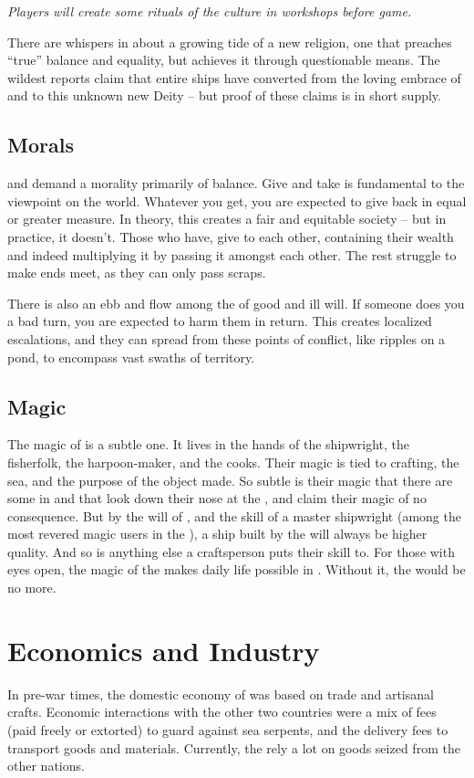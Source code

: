 \documentclass[blue]{GL2020}
\begin{document}
\emph{Players will create some rituals of the culture in workshops before game.}

There are whispers in \pShip{} about a growing tide of a new religion, one that preaches ``true'' balance and equality, but achieves it through questionable means. The wildest reports claim that entire ships have converted from the loving embrace of \cEbb{} and \cFlow{} to this unknown new Deity -- but proof of these claims is in short supply.

\subsection*{Morals}
\cEbb{} and \cFlow{} demand a morality primarily of balance. Give and take is fundamental to the \pShip{} viewpoint on the world. Whatever you get, you are expected to give back in equal or greater measure. In theory, this creates a fair and equitable society -- but in practice, it doesn't. Those who have, give to each other, containing their wealth and indeed multiplying it by passing it amongst each other. The rest struggle to make ends meet, as they can only pass scraps. 

There is also an ebb and flow among the \pShippies{} of good and ill will. If someone does you a bad turn, you are expected to harm them in return. This creates localized escalations, and they can spread from these points of conflict, like ripples on a pond, to encompass vast swaths of \pShip{} territory.

\subsection*{Magic}
The magic of \pShip{} is a subtle one. It lives in the hands of the shipwright, the fisherfolk, the harpoon-maker, and the cooks. Their magic is tied to crafting, the sea, and the purpose of the object made. So subtle is their magic that there are some in \pFarm{} and \pTech{} that look down their nose at the \pShippies{}, and claim their magic of no consequence. But by the will of \cEbb{\full}, and the skill of a master shipwright (among the most revered magic users in the \pShip{}), a ship built by the \pShippies{} will always be higher quality. And so is anything else a \pShippie{} craftsperson puts their skill to. For those with eyes open, the magic of the \pShippies{} makes daily life possible in \pEarth{}. Without it, the \pShippies{} would be no more.

\section*{Economics and Industry}
In pre-war times, the domestic economy of \pShip{} was based on trade and artisanal crafts. Economic interactions with the other two countries were a mix of fees (paid freely or extorted) to guard against sea serpents, and the delivery fees to transport goods and materials. Currently, the \pShip{} rely a lot on goods seized from the other nations.
\end{document}
